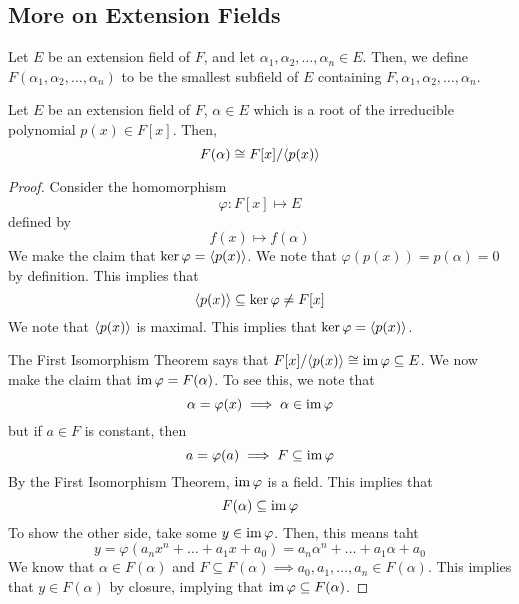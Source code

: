 \documentclass[letterpaper]{article}
\begin{document}
\subsection{More on Extension Fields}
\begin{definition}{}{}
    Let $E$ be an extension field of $F$, and let $\alpha_1, \alpha_2, \dots, \alpha_n \in E$. Then, we define $F(\alpha_1, \alpha_2, \dots, \alpha_n)$ to be the smallest subfield of $E$ containing $F, \alpha_1, \alpha_2, \dots, \alpha_n$. 
\end{definition}

\begin{theorem}{}{}
    Let $E$ be an extension field of $F$, $\alpha \in E$ which is a root of the irreducible polynomial $p(x) \in F[x]$. Then, 
    \[F(\alpha) \cong F[x] / \langle p(x) \rangle\]
\end{theorem}

\begin{mdframed}[]
    \begin{proof}
        Consider the homomorphism 
        \[\varphi: F[x] \mapsto E\]
        defined by 
        \[f(x) \mapsto f(\alpha)\]
        We make the claim that $\ker \varphi = \langle p(x) \rangle$. We note that $\varphi(p(x)) = p(\alpha) = 0$ by definition. This implies that 
        \[\langle p(x) \rangle \subseteq \ker \varphi \neq F[x]\]
        We note that $\langle p(x) \rangle$ is maximal. This implies that $\ker \varphi = \langle p(x) \rangle$. 

        \bigskip 

        The First Isomorphism Theorem says that $F[x] / \langle p(x) \rangle \cong \operatorname{im} \varphi \subseteq E$. We now make the claim that $\operatorname{im} \varphi = F(\alpha)$. To see this, we note that 
        \[\alpha = \varphi(x) \implies \alpha \in \operatorname{im} \varphi\]
        but if $a \in F$ is constant, then 
        \[a = \varphi(a) \implies F \subseteq \operatorname{im} \varphi\]
        By the First Isomorphism Theorem, $\operatorname{im} \varphi$ is a field. This implies that 
        \[F(\alpha) \subseteq \operatorname{im} \varphi\]
        To show the other side, take some $y \in \operatorname{im} \varphi$. Then, this means taht 
        \[y = \varphi(a_n x^n + \dots + a_1 x + a_0) = a_n \alpha^n + \dots + a_1 \alpha + a_0\]
        We know that $\alpha \in F(\alpha)$ and $F \subseteq F(\alpha) \implies a_0, a_1, \dots, a_n \in F(\alpha)$. This implies that $y \in F(\alpha)$ by closure, implying that $\operatorname{im} \varphi \subseteq F(\alpha)$. 
    \end{proof}
\end{mdframed}
\end{document}
